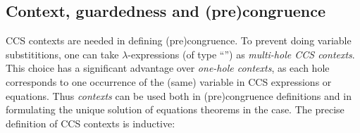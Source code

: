 
\subsection{Context, guardedness and (pre)congruence}
\label{ss:context}

CCS contexts are needed in defining (pre)congruence.
To prevent doing variable substititions, one can take
 \univariate $\lambda$-expressions (of type
``'') as \emph{multi-hole CCS contexts}.
%
This choice has a significant advantage over \emph{one-hole
contexts}, as each hole corresponds to one occurrence of the (same)
variable in \univariate CCS expressions or equations.
Thus \emph{contexts} can be used both in (pre)congruence definitions
and in formulating the unique solution of equations theorems in
the \univariate case. The precise definition of CCS contexts is inductive:
